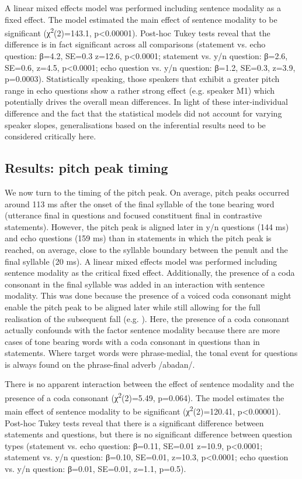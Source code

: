 A linear mixed effects model was performed including sentence modality as a fixed effect. The model estimated the main effect of sentence modality to be significant (χ\textsuperscript{2}(2)=143.1, p<0.00001). Post-hoc Tukey tests reveal that the difference is in fact significant across all comparisons (statement vs. echo question: β=4.2, SE=0.3 z=12.6, p<0.0001; statement vs. y/n question: β=2.6, SE=0.6, z=4.5, p<0.0001; echo question vs. y/n question: β=1.2, SE=0.3, z=3.9, p=0.0003). Statistically speaking, those speakers that exhibit a greater pitch range in echo questions show a rather strong effect (e.g. speaker M1) which potentially drives the overall mean differences. In light of these inter-individual difference and the fact that the statistical models did not account for varying speaker slopes, generalisations based on the inferential results need to be considered critically here.

\subsection{Results: pitch peak timing}
We now turn to the timing of the pitch peak. On average, pitch peaks occurred around 113 ms after the onset of the final syllable of the tone bearing word (utterance final in questions and focused constituent final in contrastive statements). However, the pitch peak is aligned later in y/n questions (144 ms) and echo questions (159 ms) than in statements in which the pitch peak is reached, on average, close to the syllable boundary between the penult and the final syllable (20 ms). A linear mixed effects model was performed including sentence modality as the critical fixed effect. Additionally, the presence of a coda consonant in the final syllable was added in an interaction with sentence modality. This was done because the presence of a voiced coda consonant might enable the pitch peak to be aligned later while still allowing for the full realisation of the subsequent fall (e.g. \citealt{Muecke.etal2009,NiemannMuecke2015}). Here, the presence of a coda consonant actually confounds with the factor sentence modality because there are more cases of tone bearing words with a coda consonant in questions than in statements. Where target words were phrase-medial, the tonal event for questions is always found on the phrase-final adverb /abadan/.

There is no apparent interaction between the effect of sentence modality and the presence of a coda consonant (χ\textsuperscript{2}(2)=5.49, p=0.064). The model estimates the main effect of sentence modality to be significant (χ\textsuperscript{2}(2)=120.41, p<0.00001). Post-hoc Tukey tests reveal that there is a significant difference between statements and questions, but there is no significant difference between question types (statement vs. echo question: β=0.11, SE=0.01 z=10.9, p<0.0001; statement vs. y/n question: β=0.10, SE=0.01, z=10.3, p<0.0001; echo question vs. y/n question: β=0.01, SE=0.01, z=1.1, p=0.5).


